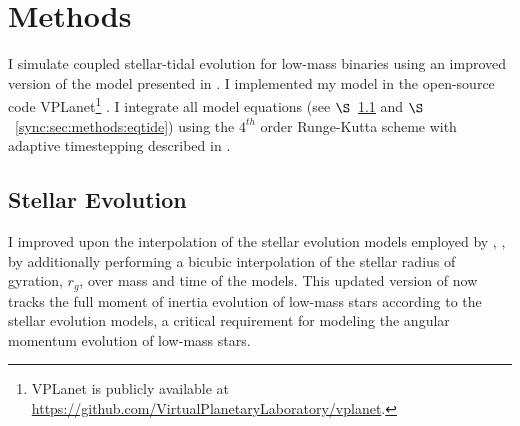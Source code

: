 
\section{Methods} \label{sync:sec:methods}

I simulate coupled stellar-tidal evolution for low-mass binaries using an improved version of the model presented in \citet{Fleming2018}.  I implemented my model in the open-source code VPLanet\footnote{VPLanet is publicly available
at \href{https://github.com/VirtualPlanetaryLaboratory/vplanet}{{https://github.com/VirtualPlanetaryLaboratory/vplanet}}.} \citep{Barnes2019}.  I integrate all model equations (see $\S$~\ref{sync:sec:methods:stellar} and $\S$~\ref{sync:sec:methods:eqtide}) using the $4^{th}$ order Runge-Kutta scheme with adaptive timestepping described in \citet{Fleming2018}.  

\subsection{Stellar Evolution} \label{sync:sec:methods:stellar}

I improved upon the interpolation of the \citet{Baraffe2015} stellar evolution models employed by \citet{Fleming2018}, \stellar, by additionally performing a bicubic interpolation of the stellar radius of gyration, $r_g$, over mass and time of the \citet{Baraffe2015} models. This updated version of \stellar now tracks the full moment of inertia evolution of low-mass stars according to the \citet{Baraffe2015} stellar evolution models, a critical requirement for modeling the angular momentum evolution of low-mass stars. 

